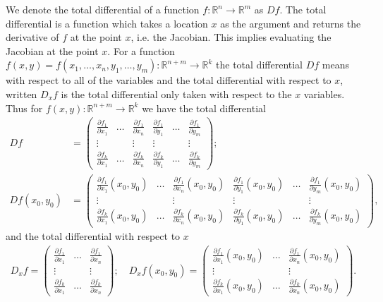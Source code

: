 \begin{remark}
	We denote the total differential of a function $f:\mathbb{R}^{n}\to \mathbb{R}^{m}$ as $Df$. The total differential is a function which takes a location $x$ as the argument and returns the derivative of $f$ at the point $x$, i.e. the Jacobian. This implies evaluating the Jacobian at the point $x$. For a function  $f(x,y)= f(x_1, \ldots, x_n, y_1, \ldots, y_m):\mathbb{R}^{n+m} \to \mathbb{R}^{k}$ the total differential $Df$ means with respect to all of the variables and the total differential with respect to $x$, written $D_xf$ is the total differential only taken with respect to the $x$ variables. Thus for $f(x,y): \mathbb{R}^{n+m} \to \mathbb{R}^{k}$ we have the total differential
	\begin{align}
		Df &= 
		\begin{pmatrix}
			\frac{\partial f_1}{\partial x_1} & \ldots & \frac{\partial f_1}{\partial x_n} &\frac{\partial f_1}{\partial y_1} &\ldots &\frac{\partial f_1}{\partial y_m}\\
			\vdots & & \vdots & \vdots && \vdots \\
			\frac{\partial f_k}{\partial x_1} & \ldots & \frac{\partial f_k}{\partial x_n} &\frac{\partial f_k}{\partial y_1} & \ldots &\frac{\partial f_k}{\partial y_m} 
		\end{pmatrix};\\[8pt]
		Df(x_0, y_0) &= 
		\begin{pmatrix}
			\frac{\partial f_1}{\partial x_1}(x_0,y_0) & \ldots & \frac{\partial f_1}{\partial x_n} (x_0,y_0) &\frac{\partial f_1}{\partial y_1}(x_0,y_0)  &\ldots &\frac{\partial f_1}{\partial y_m}(x_0,y_0) \\
			\vdots & & \vdots & \vdots && \vdots \\
			\frac{\partial f_k}{\partial x_1}(x_0,y_0)  & \ldots & \frac{\partial f_k}{\partial x_n}(x_0,y_0)  &\frac{\partial f_k}{\partial y_1}(x_0,y_0)  & \ldots &\frac{\partial f_k}{\partial y_m}(x_0,y_0)  
		\end{pmatrix},
	\end{align}
and the total differential with respect to $x$
\begin{align}
		D_x f = 
		\begin{pmatrix}
			\frac{\partial f_1}{\partial x_1} & \ldots & \frac{\partial f_1}{\partial x_n} \\
			\vdots & & \vdots \\
			\frac{\partial f_k}{\partial x_1} & \ldots & \frac{\partial f_k}{\partial x_n} 
		\end{pmatrix};\quad
		D_xf(x_0, y_0) = 
		\begin{pmatrix}
			\frac{\partial f_1}{\partial x_1}(x_0,y_0) & \ldots & \frac{\partial f_1}{\partial x_n} (x_0,y_0)\\
			\vdots & & \vdots \\
			\frac{\partial f_k}{\partial x_1}(x_0,y_0)  & \ldots & \frac{\partial f_k}{\partial x_n}(x_0,y_0) 
		\end{pmatrix}.
\end{align}
\end{remark}
